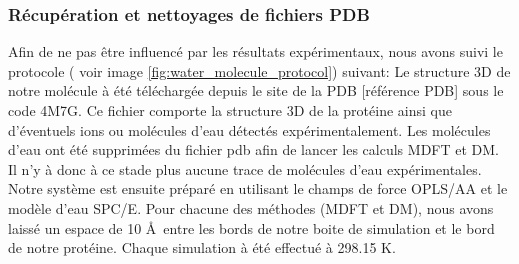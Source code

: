 \subsubsection{Récupération et nettoyages de fichiers PDB}
Afin de ne pas être influencé par les résultats expérimentaux, nous avons suivi le protocole ( voir image \ref{fig:water_molecule_protocol}) suivant: Le structure 3D de notre molécule à été téléchargée depuis le site de la PDB [référence PDB] sous le code 4M7G. Ce fichier comporte la structure 3D de la protéine ainsi que d'éventuels ions ou molécules d'eau détectés expérimentalement. Les molécules d'eau ont été supprimées du fichier pdb afin de lancer les calculs MDFT et DM. Il n'y à donc à ce stade plus aucune trace de molécules d'eau expérimentales. Notre système est ensuite préparé en utilisant le champs de force OPLS/AA\cite{jorgensen_opls_1988} et le modèle d'eau SPC/E\cite{berendsen_missing_1987}. Pour chacune des méthodes (MDFT et DM), nous avons laissé un espace de 10 \AA\ entre les bords de notre boite de simulation et le bord de notre protéine. Chaque simulation à été effectué à 298.15 K.



